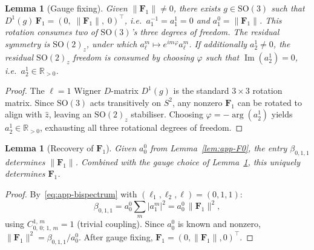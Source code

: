 \documentclass{article}
\newtheorem{lemma}[theorem]{Lemma}
\newcommand{\R}{\mathbb{R}}
\newcommand{\SO}{\mathrm{SO}}
\newcommand{\CG}[6]{C^{#5,\,#6}_{#1,\,#2;\,#3,\,#4}}
\newcommand{\abs}[1]{\lvert #1 \rvert}
\newcommand{\norm}[1]{\lVert #1 \rVert}
\begin{document}
\begin{lemma}[Gauge fixing]\label{lem:app-gauge}
Given $\norm{\mathbf{F}_1} \ne 0$, there exists $g \in \SO(3)$ such
that $D^1(g)\,\mathbf{F}_1 = (0,\; \norm{\mathbf{F}_1},\; 0)^{\!\top}$,
i.e.\ $a_1^{-1} = a_1^1 = 0$ and $a_1^0 = \norm{\mathbf{F}_1}$.
This rotation consumes two of $\SO(3)$'s three degrees of freedom.
The residual symmetry is $\SO(2)_z$, under which
$a_\ell^m \mapsto e^{im\varphi} a_\ell^m$.
If additionally $a_2^1 \ne 0$, the residual $\SO(2)_z$ freedom is
consumed by choosing $\varphi$ such that
$\operatorname{Im}(a_2^1) = 0$, i.e.\ $a_2^1 \in \R_{>0}$.
\end{lemma}
\begin{proof}
The $\ell=1$ Wigner $D$-matrix $D^1(g)$ is the standard $3 \times 3$
rotation matrix. Since $\SO(3)$ acts transitively on $S^2$, any nonzero
$\mathbf{F}_1$ can be rotated to align with $\hat{z}$, leaving an
$\SO(2)_z$ stabiliser. Choosing
$\varphi = -\arg(a_2^1)$ yields $a_2^1 \in \R_{>0}$, exhausting all
three rotational degrees of freedom.
\end{proof}

\begin{lemma}[Recovery of $\mathbf{F}_1$]\label{lem:app-F1}
Given $a_0^0$ from Lemma~\ref{lem:app-F0}, the entry $\beta_{0,1,1}$
determines $\norm{\mathbf{F}_1}$. Combined with the gauge choice
of Lemma~\ref{lem:app-gauge}, this uniquely determines $\mathbf{F}_1$.
\end{lemma}
\begin{proof}
By~\eqref{eq:app-bispectrum} with $(\ell_1, \ell_2, \ell) = (0,1,1)$:
\[
  \beta_{0,1,1}
  = a_0^0 \sum_{m} \abs{a_1^m}^2
  = a_0^0\,\norm{\mathbf{F}_1}^2,
\]
using $\CG{0}{0}{1}{m}{1}{m} = 1$ (trivial coupling). Since $a_0^0$
is known and nonzero, $\norm{\mathbf{F}_1}^2 = \beta_{0,1,1} / a_0^0$.
After gauge fixing, $\mathbf{F}_1 = (0, \norm{\mathbf{F}_1}, 0)^\top$.
\end{proof}
\end{document}
